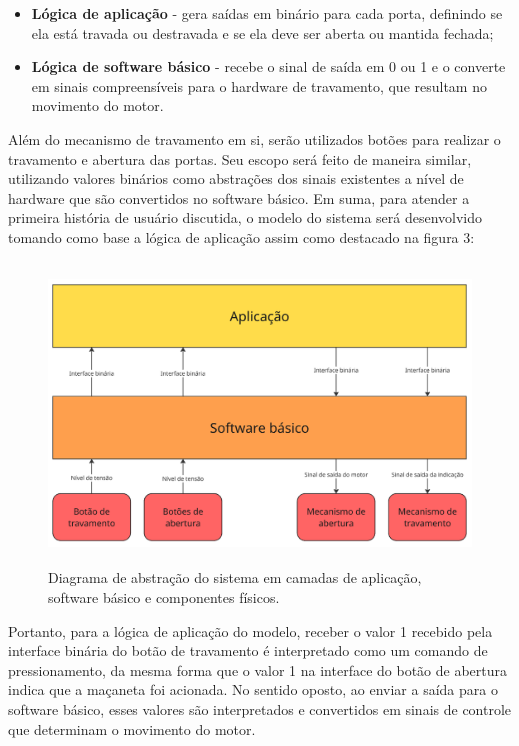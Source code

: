 \begin{itemize}
    \item \textbf{Lógica de aplicação} - gera saídas em binário para cada porta, definindo se ela está travada ou destravada e se ela deve ser aberta ou mantida fechada;
    \item \textbf{Lógica de software básico} - recebe o sinal de saída em 0 ou 1 e o converte em sinais compreensíveis para o hardware de travamento, que resultam no movimento do motor.
\end{itemize}

Além do mecanismo de travamento em si, serão utilizados botões para realizar o travamento e abertura das portas. Seu escopo será feito de maneira similar, utilizando 
valores binários como abstrações dos sinais existentes a nível de hardware que são convertidos no software básico. Em suma, para atender a primeira história de 
usuário discutida, o modelo do sistema será desenvolvido tomando como base a lógica de aplicação assim como destacado na figura 3:

\begin{figure}[H]
\centering
\includegraphics[height=8cm]{figuras/diagrama_aplication.png}
\caption{Diagrama de abstração do sistema em camadas de aplicação, software básico e componentes físicos.}
\label{fig:abstracaosw}
\end{figure}

Portanto, para a lógica de aplicação do modelo, receber o valor 1 recebido pela interface binária do botão de travamento é interpretado como um comando de 
pressionamento, da mesma forma que o valor 1 na interface do botão de abertura indica que a maçaneta foi acionada. No sentido oposto, ao enviar a saída para 
o software básico, esses valores são interpretados e convertidos em sinais de controle que determinam o movimento do motor.

